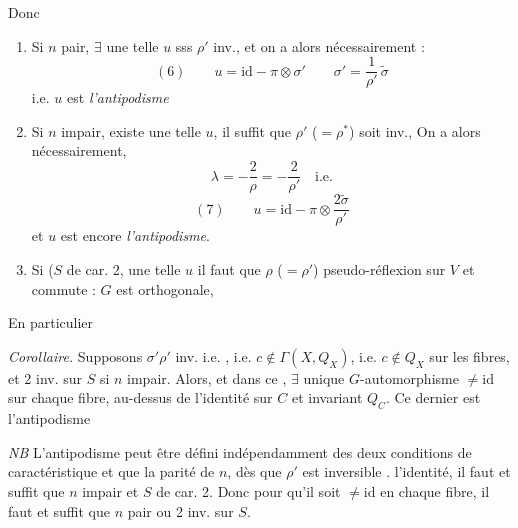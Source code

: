\documentclass[11pt,a4paper]{article}
\begin{document}
Donc
\begin{enumerate}
\item[a)] Si $n$ pair, $\exists$ une telle $u$  sss $\rho'$ inv., et on a alors nécessairement :
\[
(6) \qquad u = \mathrm{id} - \pi \otimes \sigma' \qquad \sigma' = \frac{1}{\rho'}\,\tilde{\sigma}
\]
i.e. $u$ est \emph{l'antipodisme} 
\item[b)] Si $n$ impair,  existe une telle $u$, il  suffit que $\rho'$ ($= \rho^{*}$) soit inv.,   On a alors nécessairement,
\[
\lambda = -\frac{2}{\rho} = -\frac{2}{\rho'} \quad \text{i.e.}
\]
\[
(7) \qquad u = \mathrm{id} - \pi \otimes \frac{2\tilde{\sigma}}{\rho'}
\]
et $u$ est encore \emph{l'antipodisme}.
\item[c)]  Si ($S$ de car. 2, \struck{\ill{}}  une telle $u$ il \struck{\ill{}} faut que $\rho$ ($= \rho'$) \struck{\ill{}} \ill{} \struck{\ill{}} \ill{}  pseudo-réflexion \ill{} \ill{} sur $V$ et commute : $G$ est orthogonale, 
\end{enumerate}

En particulier

\emph{Corollaire.} Supposons $\sigma'\rho'$ inv. i.e. , i.e. $c \notin \Gamma(X, Q_X)$,  i.e. $c \notin Q_X$ sur les fibres, et 2 inv. sur $S$ si $n$ impair. Alors, et dans ce , \struck{\ill{}} $\exists$ unique $G$-automorphisme $\neq \mathrm{id}$ sur chaque fibre, au-dessus de l'identité sur $C$ et invariant $Q_C$. Ce dernier est l'antipodisme

\emph{NB} L'antipodisme peut être défini  indépendamment des deux conditions de caractéristique et  que  la parité de $n$, dès que $\rho'$ est inversible .   l'identité, il faut et suffit que $n$ impair et $S$ de car. 2. Donc pour qu'il soit $\neq \mathrm{id}$ en chaque fibre, il faut et suffit que $n$ pair ou 2 inv. sur $S$.
\end{document}
